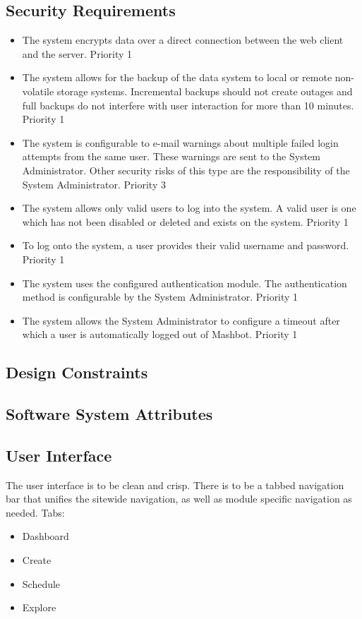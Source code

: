 \documentclass{report}
\begin{document}
	\subsection{Security Requirements} %
        \begin{itemize}
        \item The system encrypts data over a direct connection
          between the web client and the server.  Priority 1
        \item The system allows for the backup of the data system
          to local or remote non-volatile storage systems.
          Incremental backups should not create outages and full
          backups do not interfere with user interaction for more than
          10 minutes. Priority 1
        \item The system is configurable to e-mail warnings about
          multiple failed login attempts from the same user. These
          warnings are sent to the System Administrator. Other
          security risks of this type are the responsibility of the
          System Administrator. Priority 3
        \item The system allows only valid users to log into the
          system. A valid user is one which has not been disabled or
          deleted and exists on the system. Priority 1
        \item To log onto the system, a user provides their valid
          username and password. Priority 1
        \item The system uses the configured authentication
          module. The authentication method is configurable by the
          System Administrator. Priority 1
        \item The system allows the System Administrator to
          configure a timeout after which a user is automatically
          logged out of Mashbot. Priority 1
        \end{itemize}
	\subsection{Design Constraints} %
	\subsection{Software System Attributes} %
	\subsection{User Interface} %
		The user interface is to be clean and crisp. There is to be a tabbed 
		navigation bar that unifies the sitewide navigation, as well as module 
		specific navigation as needed.
        Tabs:
        \begin{itemize}
        \item Dashboard
        \item Create
        \item Schedule
        \item Explore
        \end{itemize}
\end{document}
